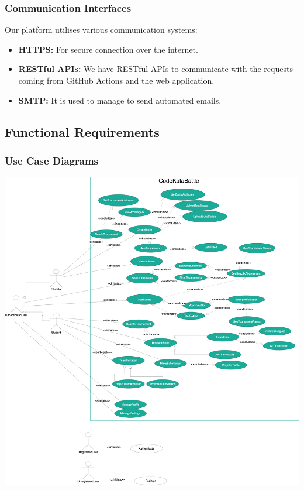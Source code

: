\subsubsection{Communication Interfaces}
Our platform utilises various communication systems:

\begin{itemize}
    \item \textbf{HTTPS:} For secure connection over the internet.

    \item \textbf{RESTful APIs:} We have RESTful APIs to communicate with the requests coming from GitHub Actions and the web application.

    \item \textbf{SMTP:} It is used to manage to send automated emails.
\end{itemize}

\subsection{Functional Requirements}
\subsubsection{Use Case Diagrams}
\includegraphics[scale=0.10]{Images/use_case_diagrams.drawio.png}


